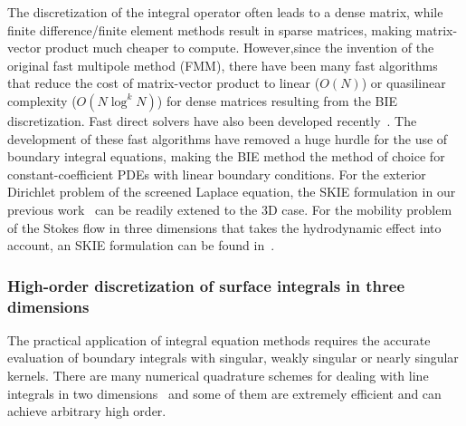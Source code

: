 The discretization of the integral operator often leads to a dense
matrix, while finite difference/finite element methods result in sparse
matrices, making matrix-vector product much cheaper to compute.
However,since the invention of the original fast multipole method
(FMM)\cite{fmm5}, there have been many fast
algorithms~\cite{fmm1,fmm2,fmm3,fmm4,fmm6,fmm7,fmm8} that reduce the
cost of matrix-vector product to linear ($O(N)$) or quasilinear
complexity ($O(N \log^kN)$) for dense matrices resulting from the BIE
discretization. Fast direct solvers have also been developed
recently~\cite{fds1,fds2,fds3,fds4,fds5,fds6,fds7,fds8,ho2016cpam2,ho2016cpam1,minden2016,minden2017siammms}.
The development of these fast algorithms have removed a huge hurdle for
the use of boundary integral equations, making the BIE method the method
of choice for constant-coefficient PDEs with linear boundary conditions.
For the exterior Dirichlet problem of the screened Laplace equation, the
SKIE formulation in our previous work~\cite{Fu2018_SIAM} can be readily
extened to the 3D case. For the mobility problem of the Stokes flow in
three dimensions that takes the hydrodynamic effect into account, an
SKIE formulation can be found in~\cite{manasthesis}.

\subsubsection{High-order discretization of surface integrals in three
dimensions}
The practical application of integral equation methods requires the
accurate evaluation of boundary integrals with singular, weakly singular
or nearly singular kernels. There are many numerical quadrature schemes
for dealing with line integrals in two
dimensions~\cite{alpert,kapur,sidi,duffy,bruno1,bruno2,davis_1984,graglia_2008,hackbusch_sauter_1994,
jarvenpaa_2003,khayat_2005,kress_boundary_1991,schwab_1992,
ying_2006,beale1,beale2,goodman_1990, haroldson_1998,
lowengrub_1993,schwab_1992,ggq1,ggq2,ggq3,helsing_2008a,helsing_integral_2009,helsing_tutorial_2012}
and some of them are extremely efficient and can achieve arbitrary high
order.

